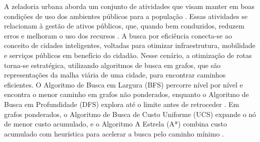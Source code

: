 \documentclass[conference,12pt]{IEEEtran}
\begin{document}
A zeladoria urbana aborda um conjunto de atividades que visam manter em boas
condições de uso dos ambientes públicos para a população
\cite{SANTOS2019}. Essas atividades se relacionam à gestão de
ativos públicos, que, quando bem conduzidos, reduzem erros e melhoram
o uso dos recursos \cite{STORCK2017}. A busca por eficiência
conecta-se ao conceito de cidades inteligentes, voltadas para
otimizar infraestrutura, mobilidade e serviços públicos em
benefício do cidadão.
Nesse cenário, a otimização de rotas torna-se
estratégica, utilizando algoritmos de busca em
grafos, que são
representações da malha viária de uma cidade, para encontrar caminhos eficientes. O
Algoritmo de Busca em Largura (BFS)
percorre nível por nível e encontra o menor caminho em
grafos não ponderados, enquanto o Algoritmo de Busca em
Profundidade (DFS) explora até o
limite antes de retroceder \cite{CORMEN2012}. Em grafos
ponderados, o Algoritmo de Busca de Custo Uniforme
(UCS) expande o nó de menor
custo acumulado, e o Algoritmo A Estrela (A*)
combina custo acumulado com heurística para acelerar
a busca pelo caminho mínimo \cite{CORMEN2012}.


\end{document}
